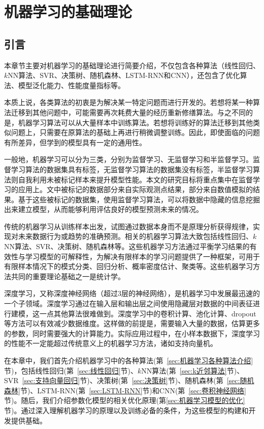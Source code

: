 \chapter{机器学习的基础理论}\label{chap:机器学习的基础理论}

\section{引言}

本章节主要对机器学习的基础理论进行简要介绍，不仅包含各种算法（线性回归、$k$NN算法、SVR、决策树、随机森林、LSTM-RNN和CNN），还包含了优化算法、模型泛化能力、性能度量指标等。

本质上说，各类算法的初衷是为解决某一特定问题而进行开发的。若想将某一种算法迁移到其他问题中，可能需要再次耗费大量的经历重新修缮算法。与之不同的是，机器学习算法可以从大量样本中训练算法。若想将训练好的算法迁移到其他类似问题上，只需要在原算法的基础上再进行稍微调整训练。因此，即使面临的问题有所差异，但学到的模型具有一定的通用性\citep{Goodfellow2016Deep}。

一般地，机器学习可以分为三类，分别为监督学习、无监督学习和半监督学习。监督学习算法的数据集具有标签，无监督学习算法的数据集没有标签，半监督学习算法则自我利用未被标记样本来提升模型性能。本文的研究目标将重点集中在监督学习的应用上。文中被标记的数据部分来自实际观测点结果，部分来自数值模拟的结果。基于这些被标记的数据集，使用监督学习算法，可以将数据中隐藏的信息挖掘出来建立模型，从而能够利用评估良好的模型预测未来的情况。

传统的机器学习从训练样本出发，试图通过数据本身而不是原理分析获得规律，实现对未来数据行为或趋势的准确预测。相关的机器学习算法大致包括线性回归、$k$NN算法、SVR、决策树、随机森林等。这些机器学习方法通过平衡学习结果的有效性与学习模型的可解释性，为解决有限样本的学习问题提供了一种框架，可用于有限样本情况下的模式分类、回归分析、概率密度估计、聚类等。这些机器学习方法共同的重要理论基础之一是统计学。

深度学习，又称深度神经网络（超过3层的神经网络），是机器学习中发展最迅速的一个子领域。深度学习通过在输入层和输出层之间使用隐藏层对数据的中间表征进行建模，这一点其他算法很难做到。深度学习中的卷积计算、池化计算、dropout等方法可以有效减少数据维度。这样做的前提是，需要输入大量的数据，估算更多的参数，同时需要强大的计算能力。实际应用过程中，在小样本数据下，深度学习的性能不一定能超过传统意义上的机器学习方法，诸如支持向量机。

在本章中，我们首先介绍机器学习中的各种算法(第~\ref{sec:机器学习各种算法介绍}节)，包括线性回归(第~\ref{sec:线性回归}节)、$k$NN算法(第~\ref{sec:k近邻算法}节)、SVR~\ref{sec:支持向量回归}节)、决策树(第~\ref{sec:决策树}节)、随机森林(第~\ref{sec:随机森林}节)、LSTM-RNN(第~\ref{sec:LSTM-RNN}节)和CNN(第~\ref{sec:卷积神经网络}节)。随后，我们介绍参数化模型的相关优化原理(第\ref{sec:机器学习模型的优化}节)。通过深入理解机器学习的原理以及训练必备的条件，为这些模型的构建和开发提供基础。


